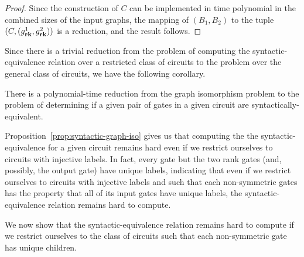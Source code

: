 \documentclass[../paper.tex]{subfiles}
\begin{document}
\begin{proof}
  Since the construction of $C$ can be implemented in time polynomial in the
  combined sizes of the input graphs, the mapping of $(B_1, B_2)$ to the tuple
  $(C, (g^1_{\text{\textbf{rk}}}, g^2_{\text{\textbf{rk}}}))$ is a reduction, and the result follows.
\end{proof}

Since there is a trivial reduction from the problem of computing the
syntactic-equivalence relation over a restricted class of circuits to the
problem over the general class of circuits, we have the following corollary.

\begin{cor}
  There is a polynomial-time reduction from the graph isomorphism problem to the
  problem of determining if a given pair of gates in a given circuit are
  syntactically-equivalent.
  \label{cor:syntactically-equivilent-general-hard}
\end{cor}

Proposition~\ref{prop:syntactic-graph-iso} gives us that computing the the
syntactic-equivalence for a given circuit remains hard even if we restrict
ourselves to circuits with injective labels. In fact, every gate but the two
rank gates (and, possibly, the output gate) have unique labels, indicating that
even if we restrict ourselves to circuits with injective labels and such that
each non-symmetric gates has the property that all of its input gates have
unique labels, the syntactic-equivalence relation remains hard to compute.

We now show that the syntactic-equivalence relation remains hard to compute if
we restrict ourselves to the class of circuits such that each non-symmetric gate
has unique children.
\end{document}
